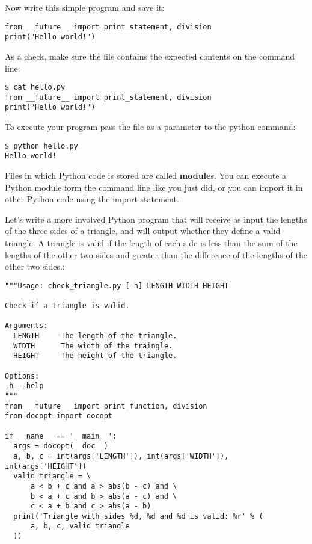 Now write this simple program and save it:

\begin{verbatim}
from __future__ import print_statement, division
print("Hello world!")
\end{verbatim}

As a check, make sure the file contains the expected contents on the
command line:

\begin{verbatim}
$ cat hello.py
from __future__ import print_statement, division
print("Hello world!")
\end{verbatim}

To execute your program pass the file as a parameter to the python
command:

\begin{verbatim}
$ python hello.py
Hello world!
\end{verbatim}

Files in which Python code is stored are called \textbf{module}s. You
can execute a Python module form the command line like you just did, or
you can import it in other Python code using the import statement.

Let's write a more involved Python program that will receive as input
the lengths of the three sides of a triangle, and will output whether
they define a valid triangle. A triangle is valid if the length of each
side is less than the sum of the lengths of the other two sides and
greater than the difference of the lengths of the other two sides.:

\begin{verbatim}
"""Usage: check_triangle.py [-h] LENGTH WIDTH HEIGHT

Check if a triangle is valid.

Arguments:
  LENGTH     The length of the triangle.
  WIDTH      The width of the traingle.
  HEIGHT     The height of the triangle.

Options:
-h --help
"""
from __future__ import print_function, division
from docopt import docopt

if __name__ == '__main__':
  args = docopt(__doc__)
  a, b, c = int(args['LENGTH']), int(args['WIDTH']), int(args['HEIGHT'])
  valid_triangle = \
      a < b + c and a > abs(b - c) and \
      b < a + c and b > abs(a - c) and \
      c < a + b and c > abs(a - b)
  print('Triangle with sides %d, %d and %d is valid: %r' % (
      a, b, c, valid_triangle
  ))
\end{verbatim}

